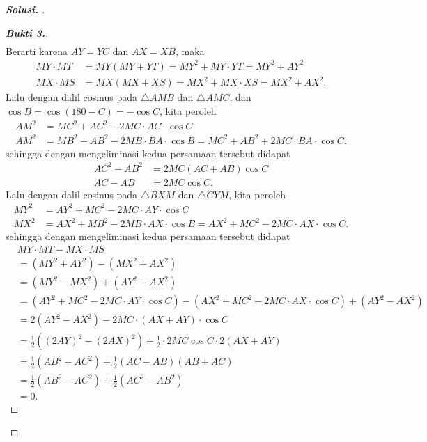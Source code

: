 \documentclass[letterpaper, 13pt]{scrartcl}
\begin{document}
\begin{proof}[\textbf{Solusi. }]
\begin{proof}[\textbf{Bukti 3.}]
\begin{align*}
        \end{align*}
        Berarti karena $AY=YC$ dan $AX=XB$, maka 
        \begin{align*}
            MY \cdot MT &= MY(MY+YT) = MY^2 + MY \cdot YT = MY^2 + AY^2\\
            MX \cdot MS &= MX(MX+XS) = MX^2 + MX \cdot XS = MX^2 + AX^2.
        \end{align*}
        Lalu dengan dalil cosinus pada $\triangle AMB$ dan $\triangle AMC$, dan $\cos B = \cos(180- C) = -\cos C$, kita peroleh
        \begin{align*}
            AM^2 &= MC^2 + AC^2 - 2MC \cdot AC \cdot \cos C\\
            AM^2 &= MB^2 + AB^2 - 2MB \cdot BA \cdot \cos B = MC^2 + AB^2 + 2MC \cdot BA \cdot \cos C.
        \end{align*}
        sehingga dengan mengeliminasi kedua persamaan tersebut didapat
        \begin{align*}
            AC^2 - AB^2 &= 2MC (AC+AB) \cos C\\
            AC - AB &= 2MC \cos C.
        \end{align*}
        Lalu dengan dalil cosinus pada $\triangle BXM$ dan $\triangle CYM$, kita peroleh
        \begin{align*}
            MY^2 &= AY^2 + MC^2 - 2MC \cdot AY \cdot \cos C\\
            MX^2 &= AX^2 + MB^2 - 2MB \cdot AX \cdot \cos B = AX^2 + MC^2 - 2MC \cdot AX \cdot \cos C.
        \end{align*}
        sehingga dengan mengeliminasi kedua persamaan tersebut didapat
        \begin{align*}
            &MY \cdot MT - MX \cdot MS\\ 
            &= (MY^2 + AY^2) - (MX^2 + AX^2)\\
            &= (MY^2 - MX^2) + (AY^2 - AX^2)\\
            &= (AY^2 + MC^2 - 2MC \cdot AY \cdot \cos C) - (AX^2 + MC^2 - 2MC \cdot AX \cdot \cos C) + (AY^2 - AX^2)\\
            &= 2(AY^2 - AX^2) - 2 MC \cdot (AX+AY) \cdot \cos C\\
            &= \frac12((2AY)^2 - (2AX)^2) + \frac12 \cdot 2 MC \cos C \cdot 2(AX+AY) \\
            &= \frac12(AB^2-AC^2) + \frac12(AC-AB)(AB+AC)\\
            &= \frac12(AB^2-AC^2) + \frac12(AC^2-AB^2)\\
            &= 0.

\end{align*}
\end{proof}
\end{proof}
\end{document}
